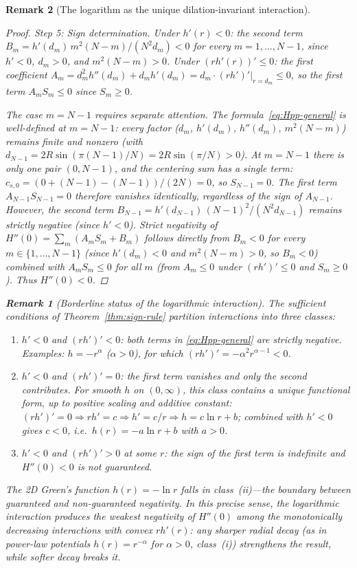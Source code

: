 \documentclass[12pt, a4paper]{article}
\newtheorem{remark}{Remark}[section]
\numberwithin{equation}{section}
\begin{document}
\begin{remark}[The logarithm as the unique dilation-invariant interaction]
\begin{proof}
\emph{Step 5: Sign determination.}
Under $h'(r) < 0$: the second term
$B_m = h'(d_m)\,m^2(N{-}m)/(N^2 d_m) < 0$
for every $m = 1, \ldots, N-1$, since $h' < 0$, $d_m > 0$,
and $m^2(N{-}m) > 0$.
Under $(rh'(r))' \le 0$: the first coefficient
$A_m = d_m^2 h''(d_m) + d_m h'(d_m) = d_m \cdot (rh')'\big|_{r=d_m} \le 0$,
so the first term $A_m S_m \le 0$ since $S_m \ge 0$.

The case $m = N{-}1$ requires separate attention.
The formula~\eqref{eq:Hpp-general} is well-defined at $m = N{-}1$:
every factor ($d_m$, $h'(d_m)$, $h''(d_m)$, $m^2(N{-}m)$) remains
finite and nonzero (with $d_{N-1} = 2R\sin(\pi(N{-}1)/N)
= 2R\sin(\pi/N) > 0$).
At $m = N{-}1$ there is only one pair $(0, N{-}1)$, and the
centering sum has a single term:
$c_{s,0} = (0 + (N{-}1) - (N{-}1))/(2N) = 0$,
so $S_{N-1} = 0$.  The first term $A_{N-1} S_{N-1} = 0$ therefore
\emph{vanishes identically}, regardless of the sign of $A_{N-1}$.
However, the second term $B_{N-1} = h'(d_{N-1})\,(N{-}1)^2/(N^2 d_{N-1})$
remains strictly negative (since $h' < 0$).
Strict negativity of $H''(0) = \sum_m (A_m S_m + B_m)$ follows
directly from $B_m < 0$ for every $m \in \{1,\ldots,N{-}1\}$
(since $h'(d_m) < 0$ and $m^2(N{-}m) > 0$, so $B_m < 0$) combined
with $A_m S_m \le 0$ for all $m$ (from $A_m \le 0$ under
$(rh')' \le 0$ and $S_m \ge 0$).  Thus $H''(0) < 0$.
\end{proof}

\begin{remark}[Borderline status of the logarithmic interaction]
\label{rem:borderline}
The sufficient conditions of Theorem~\ref{thm:sign-rule} partition
interactions into three classes:
\begin{enumerate}
  \item[(i)] $h' < 0$ and $(rh')' < 0$: both terms in
    \eqref{eq:Hpp-general} are strictly negative.
    Examples: $h = -r^\alpha$ ($\alpha > 0$), for which
    $(rh')' = -\alpha^2 r^{\alpha-1} < 0$.
  \item[(ii)] $h' < 0$ and $(rh')' = 0$: the first term vanishes
    and only the second contributes.  For smooth $h$ on $(0,\infty)$,
    this class contains a unique functional form, up to positive
    scaling and additive constant:
    $(rh')' = 0 \Rightarrow rh' = c \Rightarrow h' = c/r
    \Rightarrow h = c\ln r + b$; combined with $h' < 0$ gives
    $c < 0$, i.e.\ $h(r) = -a\ln r + b$ with $a > 0$.
  \item[(iii)] $h' < 0$ and $(rh')' > 0$ at some $r$: the sign of
    the first term is indefinite and $H''(0) < 0$ is not guaranteed.
\end{enumerate}
The 2D Green's function $h(r) = -\ln r$ falls in class~(ii)---the
boundary between guaranteed and non-guaranteed negativity.  In this
precise sense, the logarithmic interaction produces the \emph{weakest}
negativity of $H''(0)$ among the monotonically decreasing interactions
with convex $r h'(r)$: any sharper radial decay (as in power-law
potentials $h(r) = r^{-\alpha}$ for $\alpha > 0$, class~(i)) strengthens
the result, while softer decay breaks it.


\end{remark}
\end{remark}
\end{document}

